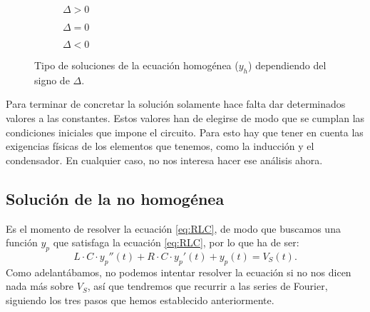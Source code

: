 \begin{figure}
\begin{figurebox}
    \vspace{10pt}
    \centering
      \begin{subfigure}{.3\textwidth}
          \centering
          \scalebox{0.25}{ }
          \caption{$\Delta>0$}
          \label{fig:0a} 
      \end{subfigure} %
      \begin{subfigure}{.3\textwidth}
          \centering
          \scalebox{0.25}{}
          \caption{$\Delta=0$}
          \label{fig:0b}
      \end{subfigure} %
      \begin{subfigure}{.3\textwidth}
          \centering
          \scalebox{0.25}{}
          \caption{$\Delta<0$}
          \label{fig:0c}
      \end{subfigure}
      \caption{Tipo de soluciones de la ecuación homogénea ($y_h$) dependiendo del signo de $\Delta$.}
      \label{fig:SolucionesHomogenea}
    
\end{figurebox}
\end{figure}

Para terminar de concretar la solución solamente hace falta dar determinados valores a las constantes. Estos valores han de elegirse de modo que se cumplan las condiciones iniciales que impone el circuito. Para esto hay que tener en cuenta las exigencias físicas de los elementos que tenemos, como la inducción y el condensador. En cualquier caso, no nos interesa hacer ese análisis ahora.


\subsection{Solución de la no homogénea} 
Es el momento de resolver la ecuación \eqref{eq:RLC}, de modo que buscamos una función $y_p$ que satisfaga la ecuación \eqref{eq:RLC}, por lo que ha de ser:
\[
L\cdot C \cdot y_p '' (t) + R\cdot C\cdot y_p'(t) + y_p(t) = V_S(t).
\]
Como adelantábamos, no podemos intentar resolver la ecuación si no nos dicen nada más sobre $V_S$, así que tendremos que recurrir a las series de Fourier, siguiendo los tres pasos que hemos establecido anteriormente.

